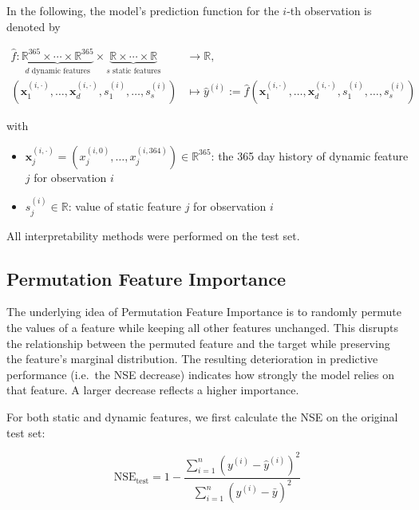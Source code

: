 \documentclass[
]{krantz}
\providecommand{\tightlist}{%
  \setlength{\itemsep}{0pt}\setlength{\parskip}{0pt}}
\begin{document}
In the following, the model's prediction function for the \(i\)-th observation is denoted by

\begin{align*}
\hat{f}: \underbrace{\mathbb{R}^{365} \times \cdots \times \mathbb{R}^{365}}_{d \text{ dynamic features}} \times \underbrace{\mathbb{R} \times \cdots \times \mathbb{R}}_{s \text{ static features}} &\longrightarrow \mathbb{R}, \\[4pt]
\left(\boldsymbol x_1^{(i, \cdot)}, \dots, \boldsymbol x_d^{(i, \cdot)}, s_1^{(i)}, \dots, s_s^{(i)}\right) &\longmapsto \hat{y}^{(i)} := \hat{f}\left(\boldsymbol x_1^{(i, \cdot)}, \dots, \boldsymbol x_d^{(i, \cdot)}, s_1^{(i)}, \dots, s_s^{(i)}\right)
\end{align*}

with

\begin{itemize}
\tightlist
\item
  \(\boldsymbol x_j^{(i, \cdot)} = \left(x_j^{(i, 0)}, \dots, x_j^{(i, 364)}\right) \in \mathbb{R}^{365}\): the 365 day history of dynamic feature \(j\) for observation \(i\)
\item
  \(s_j^{(i)} \in \mathbb{R}\): value of static feature \(j\) for observation \(i\)
\end{itemize}

All interpretability methods were performed on the test set.

\newpage

\subsection{Permutation Feature Importance}\label{permutation-feature-importance}

The underlying idea of Permutation Feature Importance is to randomly permute the values of a feature while keeping all other features unchanged. This disrupts the relationship between the permuted feature and the target while preserving the feature's marginal distribution. The resulting deterioration in predictive performance (i.e.~the NSE decrease) indicates how strongly the model relies on that feature. A larger decrease reflects a higher importance.

For both static and dynamic features, we first calculate the NSE on the original test set:

\[
\mathrm{NSE}_{\text{test}} = 1 - \frac{\sum_{i = 1}^n \left(y^{(i)} - \hat{y}^{(i)}\right)^2}{\sum_{i = 1}^n \left(y^{(i)} - \bar{y}\right)^2} 
\]
\end{document}
